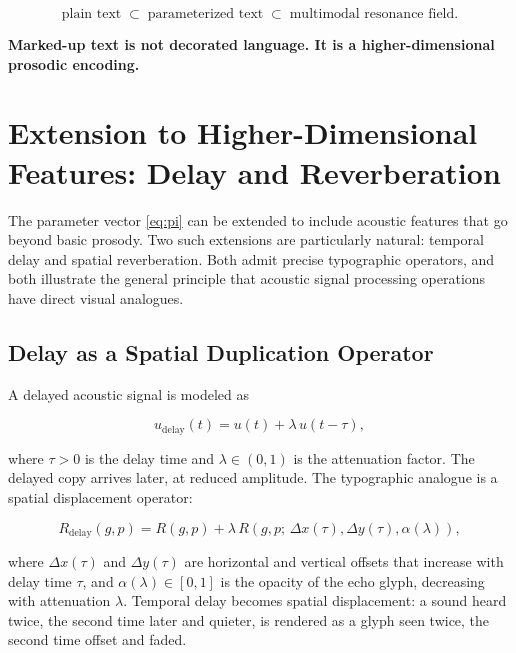 \documentclass[12pt, a4paper]{article}
\newcommand{\hyperemph}[1]{\textbf{\large #1}}
\begin{document}
\begin{equation}
\text{plain text} \;\subset\; \text{parameterized text} \;\subset\; \text{multimodal resonance field}.
\label{eq:inclusion}
\end{equation}

\begin{center}
\hyperemph{Marked-up text is not decorated language. It is a higher-dimensional prosodic encoding.}
\end{center}

\section{Extension to Higher-Dimensional Features: Delay and Reverberation}

The parameter vector \eqref{eq:pi} can be extended to include acoustic features that go beyond basic prosody. Two such extensions are particularly natural: temporal delay and spatial reverberation. Both admit precise typographic operators, and both illustrate the general principle that acoustic signal processing operations have direct visual analogues.

\subsection{Delay as a Spatial Duplication Operator}

A delayed acoustic signal is modeled as

\begin{equation}
u_{\mathrm{delay}}(t) = u(t) + \lambda\, u(t - \tau),
\label{eq:delay}
\end{equation}

where $\tau > 0$ is the delay time and $\lambda \in (0, 1)$ is the attenuation factor. The delayed copy arrives later, at reduced amplitude. The typographic analogue is a spatial displacement operator:

\begin{equation}
R_{\mathrm{delay}}(g, p) = R(g, p) + \lambda\, R\!\left(g, p;\, \Delta x(\tau), \Delta y(\tau), \alpha(\lambda)\right),
\label{eq:Rdelay}
\end{equation}

where $\Delta x(\tau)$ and $\Delta y(\tau)$ are horizontal and vertical offsets that increase with delay time $\tau$, and $\alpha(\lambda) \in [0,1]$ is the opacity of the echo glyph, decreasing with attenuation $\lambda$. Temporal delay becomes spatial displacement: a sound heard twice, the second time later and quieter, is rendered as a glyph seen twice, the second time offset and faded.
\end{document}
